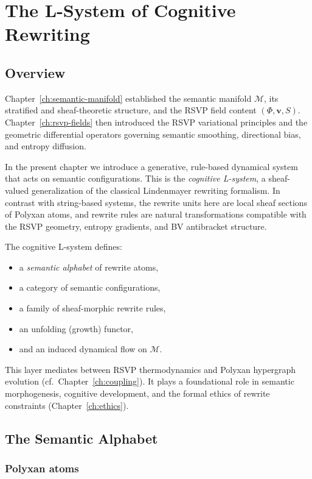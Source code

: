 \chapter{The L-System of Cognitive Rewriting}
\label{ch:lsystem}

\section{Overview}

Chapter~\ref{ch:semantic-manifold} established the semantic manifold
$\mathcal{M}$, its stratified and sheaf-theoretic structure, and the RSVP field
content $(\Phi,\mathbf{v},S)$. Chapter~\ref{ch:rsvp-fields} then introduced the
RSVP variational principles and the geometric differential operators governing
semantic smoothing, directional bias, and entropy diffusion.

In the present chapter we introduce a generative, rule-based dynamical system
that acts on semantic configurations. This is the \emph{cognitive L-system},
a sheaf-valued generalization of the classical Lindenmayer rewriting formalism.
In contrast with string-based systems, the rewrite units here are local sheaf
sections of Polyxan atoms, and rewrite rules are natural transformations
compatible with the RSVP geometry, entropy gradients, and BV antibracket
structure.

The cognitive L-system defines:
\begin{itemize}
  \item a \emph{semantic alphabet} of rewrite atoms,
  \item a category of semantic configurations,
  \item a family of sheaf-morphic rewrite rules,
  \item an unfolding (growth) functor,
  \item and an induced dynamical flow on $\mathcal{M}$.
\end{itemize}

This layer mediates between RSVP thermodynamics and Polyxan hypergraph
evolution (cf.\ Chapter~\ref{ch:coupling}). It plays a foundational role in
semantic morphogenesis, cognitive development, and the formal ethics of
rewrite constraints (Chapter~\ref{ch:ethics}).

\section{The Semantic Alphabet}

\subsection{Polyxan atoms}

